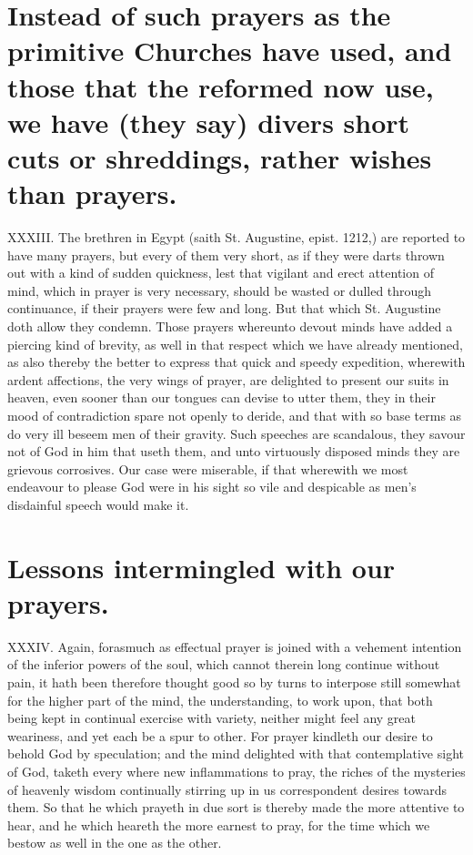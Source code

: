 \section*{Instead of such prayers as the primitive Churches have used, and those that the reformed now use, we have (they say) divers short cuts or shreddings, rather wishes than prayers.}
XXXIII. The brethren in Egypt (saith St. Augustine, epist. 1212,) are reported to have many prayers, but every of them very short, as if they were darts thrown out with a kind of sudden quickness, lest that vigilant and erect attention of mind, which in prayer is very necessary, should be wasted or dulled through continuance, if their prayers were few and long. But that which St. Augustine doth allow they  condemn. Those prayers whereunto devout minds have added a piercing kind of brevity, as well in that respect which we have already mentioned, as also thereby the better to express that quick and speedy expedition, wherewith ardent affections, the very wings of prayer, are delighted to present our suits in heaven, even sooner than our tongues can devise to utter them, they in their mood of contradiction spare not openly to deride, and that with so base terms as do very ill beseem men of their gravity. Such speeches are scandalous, they savour not of God in him that useth them, and unto virtuously disposed minds they are grievous corrosives.
 Our case were miserable, if that wherewith we most endeavour to please God were in his sight so vile and despicable as men’s disdainful speech would make it.


\section*{Lessons intermingled with our prayers.}
XXXIV. Again, forasmuch as effectual prayer is joined with a vehement intention of the inferior powers of the soul, which cannot therein long continue without pain, it hath been therefore thought good so by turns to interpose still somewhat for the higher part of the mind, the understanding, to work upon, that both being kept in continual exercise with variety, neither might feel any great weariness, and yet each be a spur to other. For prayer kindleth our desire to behold God by speculation; and the mind delighted with that contemplative sight of God, taketh every where new inflammations to pray, the riches of the mysteries of heavenly wisdom continually stirring up in us correspondent desires towards them. So that he which prayeth in due sort is thereby made the more attentive to hear, and he which heareth the more earnest to pray, for the time which we bestow as well in the one as the other.




